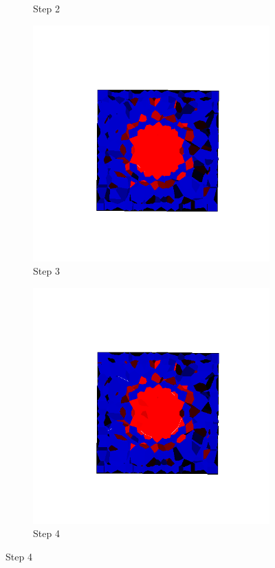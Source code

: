 \begin{figure}[ht!]
\begin{subfigure}{.25\textwidth}
      \caption{Step 2}
      \end{subfigure}%
      \begin{subfigure}{.25\textwidth}
        \centering
        \includegraphics[width=1.0\linewidth]{Files/Small_ASR/IS/DEP5-STEP(003).png}
      \caption{Step 3}
      \end{subfigure}%
      \begin{subfigure}{.25\textwidth}
        \centering
        \includegraphics[width=1.0\linewidth]{Files/Small_ASR/IS/DEP5-STEP(004).png}
      \caption{Step 4}
      \end{subfigure}


\end{figure}
